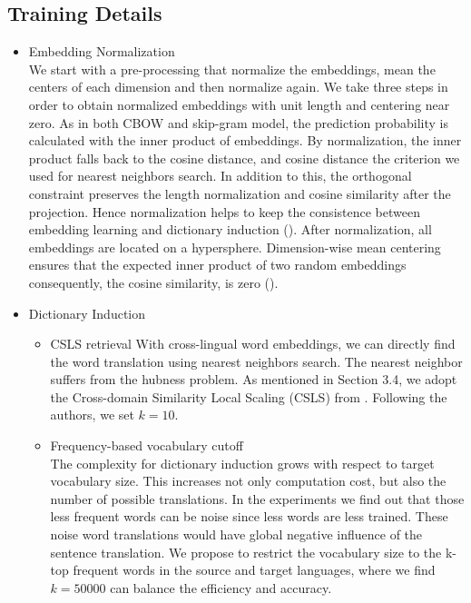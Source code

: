 \subsection{Training Details}
\begin{itemize}
	
\item Embedding Normalization\\
We start with a pre-processing that normalize the embeddings, mean the centers of each dimension and then normalize again. We take three steps in order to obtain normalized embeddings with unit length and centering near zero. As in both CBOW and skip-gram model, the prediction probability is calculated with the inner product of embeddings. By normalization, the inner product falls back to the cosine distance, and cosine distance the criterion we used for nearest neighbors search. In addition to this, the orthogonal constraint preserves the length normalization and cosine similarity after the projection. Hence normalization helps to keep the consistence between embedding learning and dictionary induction (\cite{xing2015normalized}). After normalization, all embeddings are located on a hypersphere. Dimension-wise mean centering ensures that the expected inner product of two random embeddings  consequently, the cosine similarity, is zero (\cite{artetxe2016learning}).

	\item Dictionary Induction
	\begin{itemize}
		\item CSLS retrieval
		 With cross-lingual word embeddings, we can directly find the word translation using nearest neighbors search. The nearest neighbor suffers from the hubness problem. As mentioned in Section 3.4, we adopt the Cross-domain Similarity Local Scaling (CSLS) from \cite{DBLP:journals/corr/abs-1710-04087}. Following the authors, we set $k=10$.
		 \item Frequency-based vocabulary cutoff\\
		 The complexity for dictionary induction grows with respect to target vocabulary size. This increases not only  computation cost, but also the number of possible translations. In the experiments we find out that those less frequent words can be noise since less words are less trained. These noise word translations would have global negative influence of the sentence translation.
		 We propose to restrict the vocabulary size to the k-top frequent words in the source and target languages, where we find $k=50000$ can balance the efficiency and accuracy.	 
	\end{itemize}



\end{itemize}
